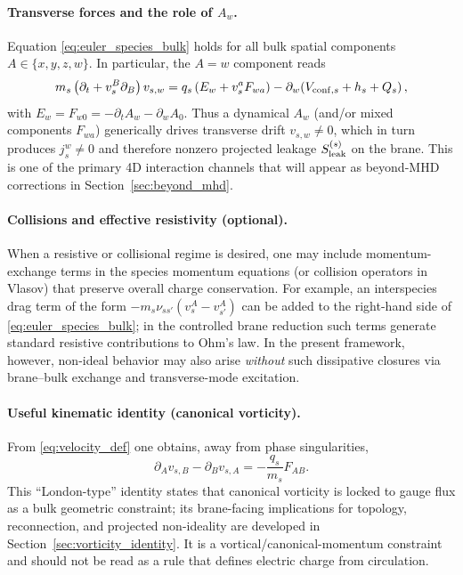 \documentclass[11pt]{article}
\newcommand{\Sleak}{S_{\rm leak}}
\begin{document}
\paragraph{Transverse forces and the role of \texorpdfstring{$A_w$}{Aw}.}
Equation \eqref{eq:euler_species_bulk} holds for all bulk spatial components
\(A\in\{x,y,z,w\}\). In particular, the \(A=w\) component reads
\begin{equation}
m_s\left(\partial_t + v_s^B\partial_B\right)v_{s,w}
=
q_s\left(E_w + v_s^a F_{wa}\right)
-\partial_w\!\left(
V_{{\rm conf},s}
+h_s
+Q_s
\right),
\label{eq:euler_species_w}
\end{equation}
with \(E_w=F_{w0}=-\partial_t A_w-\partial_w A_0\). Thus a dynamical \(A_w\) (and/or
mixed components \(F_{wa}\)) generically drives transverse drift \(v_{s,w}\neq 0\),
which in turn produces \(j_s^w\neq 0\) and therefore nonzero projected leakage
\(\Sleak^{(s)}\) on the brane. This is one of the primary 4D interaction channels
that will appear as beyond-MHD corrections in Section~\ref{sec:beyond_mhd}.

\paragraph{Collisions and effective resistivity (optional).}
When a resistive or collisional regime is desired, one may include momentum-exchange
terms in the species momentum equations (or collision operators in Vlasov) that
preserve overall charge conservation. For example, an interspecies drag term of the
form \(-m_s\nu_{ss'}(v_s^A-v_{s'}^A)\) can be added to the right-hand side of
\eqref{eq:euler_species_bulk}; in the controlled brane reduction such terms generate
standard resistive contributions to Ohm's law. In the present framework, however,
non-ideal behavior may also arise \emph{without} such dissipative closures via
brane--bulk exchange and transverse-mode excitation.

\paragraph{Useful kinematic identity (canonical vorticity).}
From \eqref{eq:velocity_def} one obtains, away from phase singularities,
\begin{equation}
\partial_A v_{s,B}-\partial_B v_{s,A}
= -\frac{q_s}{m_s}F_{AB}.
\label{eq:london_identity_bulk}
\end{equation}
This ``London-type'' identity states that canonical vorticity is locked to gauge
flux as a bulk geometric constraint; its brane-facing implications for topology,
reconnection, and projected non-ideality are developed in
Section~\ref{sec:vorticity_identity}.
It is a vortical/canonical-momentum constraint and should not be read as a rule
that defines electric charge from circulation.
\end{document}
